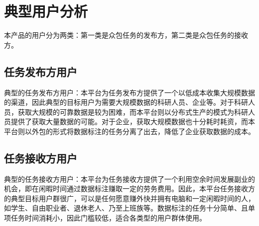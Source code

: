\section{典型用户分析}

本产品的用户分为两类：第一类是众包任务的发布方，第二类是众包任务的接收方。

\subsection{任务发布方用户}

典型的任务发布方用户：本平台为任务发布方提供了一个以低成本收集大规模数据的渠道，因此典型的目标用户为需要大规模数据的科研人员、企业等。对于科研人员，获取大规模的可靠数据是较为困难，而本平台则以分布式生产的模式为科研人员提供了获取大量数据的可能。对于企业，获取大规模数据也十分耗时耗资，而本平台则以外包的形式将数据标注的任务分离了出去，降低了企业获取数据的成本。

\subsection{任务接收方用户}

典型的任务接收方用户：本平台为任务接收方提供了一个利用空余时间发展副业的机会，即在闲暇时间通过数据标注赚取一定的劳务费用。因此，本平台任务接收方的典型目标用户群很广，可以是任何愿意赚外快并拥有电脑和一定闲暇时间的人，如学生、自由职业者、退休老人、乃至上班族等。数据标注的任务十分简单、且单项任务时间消耗小，因此门槛较低，适合各类型的用户群体使用。
